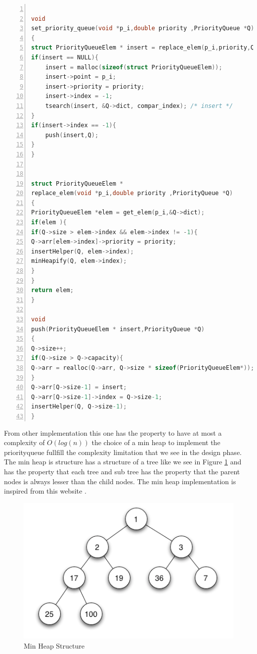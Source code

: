 \begin{lstlisting}[language=C, % Spécifie le langage du code
caption={PriorityQueue Set Elem}, % Légende du listing
label=lst:prqueueMethodSet_c, % Étiquette pour référencer le listing
numbers=left,
numberstyle=\tiny\color{gray},
stepnumber=1,
frame=single,
breaklines=true,
postbreak=\mbox{\textcolor{red}{$\hookrightarrow$}\space},
showstringspaces=false
]

void
set_priority_queue(void *p_i,double priority ,PriorityQueue *Q)
{
struct PriorityQueueElem * insert = replace_elem(p_i,priority,Q);
if(insert == NULL){
	insert = malloc(sizeof(struct PriorityQueueElem));
	insert->point = p_i;
	insert->priority = priority;
	insert->index = -1;
	tsearch(insert, &Q->dict, compar_index); /* insert */
}
if(insert->index == -1){
	push(insert,Q);
}
}


struct PriorityQueueElem *
replace_elem(void *p_i,double priority ,PriorityQueue *Q)
{
PriorityQueueElem *elem = get_elem(p_i,&Q->dict);
if(elem ){
if(Q->size > elem->index && elem->index != -1){
Q->arr[elem->index]->priority = priority;
insertHelper(Q, elem->index);
minHeapify(Q, elem->index);
}
}
return elem;
}

void
push(PriorityQueueElem * insert,PriorityQueue *Q)
{
Q->size++;
if(Q->size > Q->capacity){
Q->arr = realloc(Q->arr, Q->size * sizeof(PriorityQueueElem*));
}
Q->arr[Q->size-1] = insert;
Q->arr[Q->size-1]->index = Q->size-1;
insertHelper(Q, Q->size-1);
}

\end{lstlisting}

From other implementation this one has the property to have at most a complexity of $O(log(n))$ the choice of a min heap to implement the priorityqueue fullfill the complexity limitation that we see in the design phase. The min heap is structure has a structure of a tree like we see in Figure \ref{fig:min_heap} and has the property that each tree and sub tree has the property that the parent nodes is always lesser than the child nodes. The min heap implementation is inspired from this website \cite{GfG_2023}.



\begin{figure}[!h]
\centering
\includegraphics[width=1\linewidth]{figures/tree.png}
\caption{Min Heap Structure}
\label{fig:min_heap}
\end{figure}


